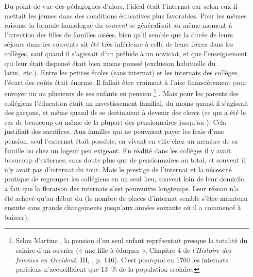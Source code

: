  Du point de vue des pédagogues d'alors, l'idéal était l'internat car selon eux il mettait les jeunes dans des conditions éducatives plus favorables. Pour les mêmes raisons, la formule homologue du \emph{couvent} se généralisait au même moment à l'intention des filles de familles aisées, bien qu'il semble que la durée de leurs séjours dans les couvents ait été très inférieure à celle de leurs frères dans les collèges, sauf quand il s'agissait d'un prélude à un noviciat, et que l'enseignement qui leur était dispensé était bien moins poussé (exclusion habituelle du latin,~etc.). Entre les petites écoles (sans internat) et les internats des collèges, l'écart des coûts était énorme. Il fallait être vraiment à l'aise financièrement pour envoyer un ou plusieurs de ses enfants en pension%
\footnote{Selon Martine , la pension d'un seul enfant représentait presque la totalité du salaire d'un ouvrier (« une fille à éduquer », Chapitre 4 de \emph{l'Histoire des femmes en Occident}, III, , p. 146). C'est pourquoi en 1760 les internats parisiens n'accueillaient que 13~\% de la population scolaire.}%
. Mais pour les parents des collégiens l'éducation était un investissement familial, du moins quand il s'agissait des garçons, et même quand ils se destinaient à devenir des clercs (ce qui a été le cas de beaucoup ou même de la plupart des pensionnaires jusqu'au ). Cela justifiait des sacrifices. Aux familles qui ne pouvaient payer les frais d'une pension, seul l'externat était possible, en vivant en ville chez un membre de sa famille ou chez un logeur peu exigeant. En réalité dans les collèges il y avait beaucoup d'externes, sans doute plus que de pensionnaires au total, et souvent il n'y avait pas d'internat du tout. Mais le prestige de l'internat et la nécessité pratique de regrouper les collégiens en un seul lieu, souvent loin de leur domicile, a fait que la floraison des internats s'est poursuivie longtemps. Leur réseau n'a été achevé qu'au début du  (le nombre de places d'internat semble s'être maintenu ensuite sans grands changements jusqu'aux années soixante où il a commencé à baisser). 

